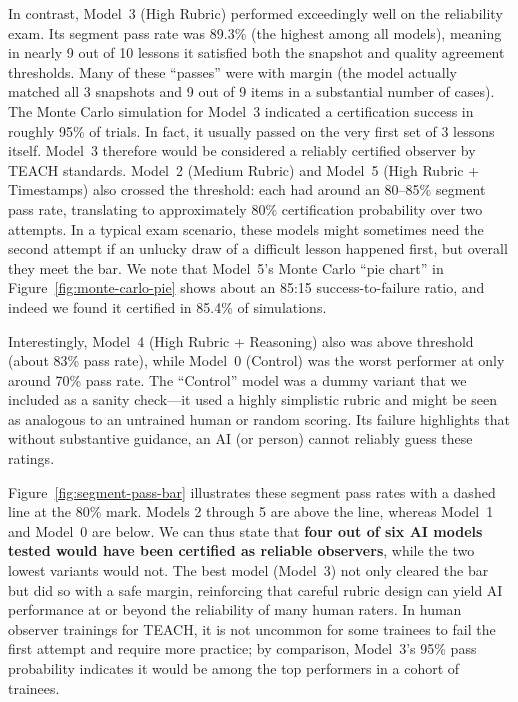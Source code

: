 \documentclass[12pt]{article}
\begin{document}
In contrast, Model~3 (High Rubric) performed exceedingly well on the reliability exam. Its segment pass rate was 89.3\% (the highest among all models), meaning in nearly 9 out of 10 lessons it satisfied both the snapshot and quality agreement thresholds. Many of these “passes” were with margin (the model actually matched all 3 snapshots and 9 out of 9 items in a substantial number of cases). The Monte Carlo simulation for Model~3 indicated a certification success in roughly 95\% of trials. In fact, it usually passed on the very first set of 3 lessons itself. Model~3 therefore would be considered a reliably certified observer by TEACH standards. Model~2 (Medium Rubric) and Model~5 (High Rubric + Timestamps) also crossed the threshold: each had around an 80–85\% segment pass rate, translating to approximately 80\% certification probability over two attempts. In a typical exam scenario, these models might sometimes need the second attempt if an unlucky draw of a difficult lesson happened first, but overall they meet the bar. We note that Model~5’s Monte Carlo “pie chart” in Figure~\ref{fig:monte-carlo-pie} shows about an 85:15 success-to-failure ratio, and indeed we found it certified in 85.4\% of simulations.

Interestingly, Model~4 (High Rubric + Reasoning) also was above threshold (about 83\% pass rate), while Model~0 (Control) was the worst performer at only around 70\% pass rate. The “Control” model was a dummy variant that we included as a sanity check—it used a highly simplistic rubric and might be seen as analogous to an untrained human or random scoring. Its failure highlights that without substantive guidance, an AI (or person) cannot reliably guess these ratings.

Figure~\ref{fig:segment-pass-bar} illustrates these segment pass rates with a dashed line at the 80\% mark. Models 2 through 5 are above the line, whereas Model~1 and Model~0 are below. We can thus state that \textbf{four out of six AI models tested would have been certified as reliable observers}, while the two lowest variants would not. The best model (Model~3) not only cleared the bar but did so with a safe margin, reinforcing that careful rubric design can yield AI performance at or beyond the reliability of many human raters. In human observer trainings for TEACH, it is not uncommon for some trainees to fail the first attempt and require more practice; by comparison, Model~3’s 95\% pass probability indicates it would be among the top performers in a cohort of trainees.
\end{document}
